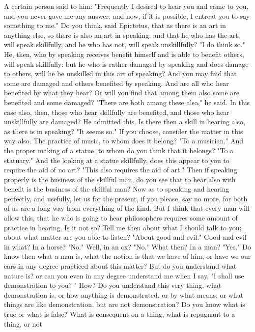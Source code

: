 \documentclass[a4paper]{article}
\begin{document}
    A certain person said to him: "Frequently I desired to hear you and came to
you, and you never gave me any answer: and now, if it is possible, I entreat
you to say something to me." Do you think, said Epictetus, that as there is an
art in anything else, so there is also an art in speaking, and that he who has
the art, will speak skillfully, and he who has not, will speak unskillfully? "I
do think so." He, then, who by speaking receives benefit himself and is able to
benefit others, will speak skillfully: but he who is rather damaged by speaking
and does damage to others, will he be unskilled in this art of speaking? And
you may find that some are damaged and others benefited by speaking. And are
all who hear benefited by what they hear? Or will you find that among them also
some are benefited and some damaged? "There are both among these also," he
said. In this case also, then, those who hear skillfully are benefited, and
those who hear unskillfully are damaged? He admitted this. Is there then a
skill in hearing also, as there is in speaking? "It seems so." If you choose,
consider the matter in this way also. The practice of music, to whom does it
belong? "To a musician." And the proper making of a statue, to whom do you
think that it belongs? "To a statuary." And the looking at a statue skillfully,
does this appear to you to require the aid of no art? "This also requires the
aid of art." Then if speaking properly is the business of the skillful man, do
you see that to hear also with benefit is the business of the skillful man? Now
as to speaking and hearing perfectly, and usefully, let us for the present, if
you please, say no more, for both of us are a long way from everything of the
kind. But I think that every man will allow this, that he who is going to hear
philosophers requires some amount of practice in hearing. Is it not so?
    Tell me then about what I should talk to you: about what matter are you
able to listen? "About good and evil." Good and evil in what? In a horse? "No."
Well, in an ox? "No." What then? In a man? "Yes." Do know then what a man is,
what the notion is that we have of him, or have we our ears in any degree
practiced about this matter? But do you understand what nature is? or can you
even in any degree understand me when I say, "I shall use demonstration to you?
" How? Do you understand this very thing, what demonstration is, or how
anything is demonstrated, or by what means; or what things are like
demonstration, but are not demonstration? Do you know what is true or what is
false? What is consequent on a thing, what is repugnant to a thing, or not
\end{document}
